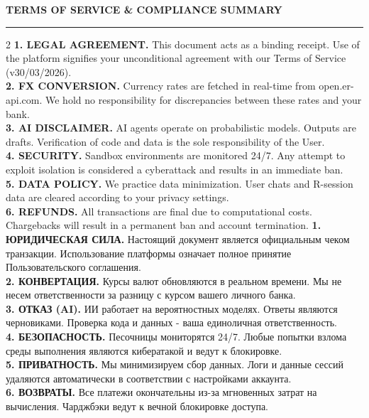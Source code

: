 \documentclass[7pt,a4paper]{extarticle}
\begin{document}
\noindent
{\fontsize{7pt}{7pt}\selectfont \textbf{TERMS OF SERVICE \& COMPLIANCE SUMMARY}} \\
\vspace{1mm}\hrule\vspace{2mm}
\begin{multicols}{2}
\fontsize{5.2pt}{7.1pt}\selectfont
\textbf{1. LEGAL AGREEMENT.} This document acts as a binding receipt. Use of the platform signifies your unconditional agreement with our Terms of Service (v30/03/2026).\\
\textbf{2. FX CONVERSION.} Currency rates are fetched in real-time from open.er-api.com. We hold no responsibility for discrepancies between these rates and your bank.\\
\textbf{3. AI DISCLAIMER.} AI agents operate on probabilistic models. Outputs are drafts. Verification of code and data is the sole responsibility of the User.\\
\textbf{4. SECURITY.} Sandbox environments are monitored 24/7. Any attempt to exploit isolation is considered a cyberattack and results in an immediate ban.\\
\textbf{5. DATA POLICY.} We practice data minimization. User chats and R-session data are cleared according to your privacy settings.\\
\textbf{6. REFUNDS.} All transactions are final due to computational costs. Chargebacks will result in a permanent ban and account termination.
\columnbreak
\textbf{1. ЮРИДИЧЕСКАЯ СИЛА.} Настоящий документ является официальным чеком транзакции. Использование платформы означает полное принятие Пользовательского соглашения.\\
\textbf{2. КОНВЕРТАЦИЯ.} Курсы валют обновляются в реальном времени. Мы не несем ответственности за разницу с курсом вашего личного банка.\\
\textbf{3. ОТКАЗ (AI).} ИИ работает на вероятностных моделях. Ответы являются черновиками. Проверка кода и данных - ваша единоличная ответственность.\\
\textbf{4. БЕЗОПАСНОСТЬ.} Песочницы мониторятся 24/7. Любые попытки взлома среды выполнения являются кибератакой и ведут к блокировке.\\
\textbf{5. ПРИВАТНОСТЬ.} Мы минимизируем сбор данных. Логи и данные сессий удаляются автоматически в соответствии с настройками аккаунта.\\
\textbf{6. ВОЗВРАТЫ.} Все платежи окончательны из-за мгновенных затрат на вычисления. Чарджбэки ведут к вечной блокировке доступа.
\end{multicols}
\end{document}
